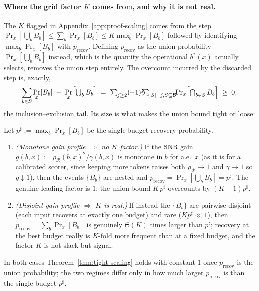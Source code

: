\paragraph{Where the grid factor $K$ comes from, and why it is not real.}
The $K$ flagged in Appendix~\ref{app:proof-scaling} comes from the step
$\Pr_x[\bigcup_b B_b]\le\sum_b\Pr_x[B_b]\le K\max_b\Pr_x[B_b]$ followed by
identifying $\max_b\Pr_x[B_b]$ with $p_{\mathrm{recov}}$. Defining
$p_{\mathrm{recov}}$ as the union probability $\Pr_x[\bigcup_b B_b]$
instead, which is the quantity the operational $b^*(x)$ actually selects, removes
the union step entirely. The overcount incurred by the discarded step is,
exactly,
\begin{equation}
\label{eq:union-overcount}
\sum_{b\in\mathcal{B}}\Pr_x[B_b] \;-\; \Pr_x\Bigl[\textstyle\bigcup_b B_b\Bigr]
\;=\; \sum_{j\ge2}(-1)^j\!\!\!\sum_{|S|=j, S\subseteq\mathcal{B}}\!\!\Pr_x\Bigl[\textstyle\bigcap_{b\in S}B_b\Bigr]
\;\ge\;0,
\end{equation}
the inclusion--exclusion tail. Its size is what makes the union bound tight or
loose:
\begin{corollary}
\label{cor:grid-tight}
Let $p^\sharp:=\max_b\Pr_x[B_b]$ be the single-budget recovery probability.
\begin{enumerate}
\item[\emph{(i)}] \emph{(Monotone gain profile $\Rightarrow$ no $K$ factor.)}
If the SNR gain $g(b,x):=\rho_{\mathcal{R}}(b,x)^2/\gamma(b,x)$ is monotone in
$b$ for a.e.\ $x$ (as it is for a calibrated scorer, since keeping more tokens
raises both $\rho_{\mathcal{R}}\to1$ and $\gamma\to1$ so $g\downarrow1$), then
the events $\{B_b\}$ are nested and
$p_{\mathrm{recov}}=\Pr_x[\bigcup_b B_b]=p^\sharp$. The genuine leading factor
is $1$; the union bound $K\,p^\sharp$ overcounts by $(K-1)p^\sharp$.
\item[\emph{(ii)}] \emph{(Disjoint gain profile $\Rightarrow$ $K$ is real.)}
If instead the $\{B_b\}$ are pairwise disjoint (each input recovers at exactly
one budget) and rare ($Kp^\sharp\ll1$), then
$p_{\mathrm{recov}}=\sum_b\Pr_x[B_b]$ is genuinely $\Theta(K)$ times larger
than $p^\sharp$; recovery at the best budget really is $K$-fold more frequent
than at a fixed budget, and the factor $K$ is not slack but signal.
\end{enumerate}
In both cases Theorem~\ref{thm:tight-scaling} holds with constant $1$ once
$p_{\mathrm{recov}}$ is the union probability; the two regimes differ only in
how much larger $p_{\mathrm{recov}}$ is than the single-budget $p^\sharp$.
\end{corollary}


